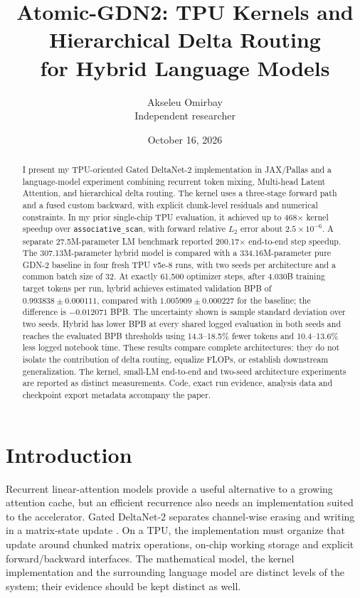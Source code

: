 \documentclass[10pt,a4paper]{article}
\title{Atomic-GDN2: TPU Kernels and Hierarchical Delta Routing\\for Hybrid Language Models}
\author{Akseleu Omirbay\\\small Independent researcher}
\date{October 16, 2026}
\begin{document}
\maketitle
\begin{abstract}
I present my TPU-oriented Gated DeltaNet-2 implementation in JAX/Pallas and a
language-model experiment combining recurrent token mixing, Multi-head Latent Attention,
and hierarchical delta routing. The kernel uses a three-stage forward path and a fused
custom backward, with explicit chunk-level residuals and numerical constraints. In my
prior single-chip TPU evaluation, it achieved up to 468$\times$ kernel speedup over
\texttt{associative\_scan}, with forward relative $L_2$ error about $2.5\times10^{-6}$.
A separate 27.5M-parameter LM benchmark reported 200.17$\times$ end-to-end step speedup. The
307.13M-parameter hybrid model is compared with a 334.16M-parameter pure GDN-2 baseline
in four fresh TPU v5e-8 runs, with two seeds per architecture and a common batch size of 32.
At exactly 61,500 optimizer steps, after 4.030B training target tokens per run, hybrid
achieves estimated validation BPB of $0.993838\pm0.000111$, compared with
$1.005909\pm0.000227$ for the baseline; the difference is $-0.012071$ BPB.
The uncertainty shown is sample standard deviation over two seeds. Hybrid has lower BPB
at every shared logged evaluation in both seeds and reaches the evaluated BPB thresholds
using 14.3--18.5\% fewer tokens and 10.4--13.6\% less logged notebook time.
These results compare complete architectures: they do not isolate the contribution of
delta routing, equalize FLOPs, or establish downstream generalization. The kernel, small-LM end-to-end and two-seed architecture experiments are reported as distinct measurements.
Code, exact run evidence, analysis data and checkpoint export metadata accompany the paper.
\end{abstract}

\section{Introduction}
Recurrent linear-attention models provide a useful alternative to a growing attention
cache, but an efficient recurrence also needs an implementation suited to the accelerator.
Gated DeltaNet-2 separates channel-wise erasing and writing in a matrix-state update
\cite{gdn2}. On a TPU, the implementation must organize that update around chunked
matrix operations, on-chip working storage and explicit forward/backward interfaces.
The mathematical model, the kernel implementation and the surrounding language model
are distinct levels of the system; their evidence should be kept distinct as well.
\end{document}
